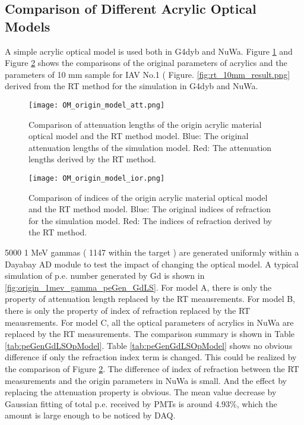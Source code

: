 \subsection{Comparison of Different Acrylic Optical Models}

A simple acrylic optical model is used both in G4dyb and NuWa. Figure \ref{fig:OM_origin_model_att.png} and
Figure \ref{fig:OM_origin_model_ior.png} shows the comparisons of the original parameters of acrylics
and the parameters of 10 mm sample for IAV No.1 ( Figure. \ref{fig:rt_10mm_result.png} derived from the RT method for the simulation in G4dyb and NuWa.


\begin{figure}
    \centering
    \texttt{[image: OM\_origin\_model\_att.png]}
    \caption[Comparison of attenuation length of the origin acrylic material optical model and the RT method model]
{
Comparison of attenuation lengths of the origin acrylic material optical model and the RT method model.
Blue: The original attenuation lengths of the simulation model.
Red: The attenuation lengths derived by the RT method.
}
    \label{fig:OM_origin_model_att.png}
    \end{figure}

\begin{figure}
    \centering
    \texttt{[image: OM\_origin\_model\_ior.png]}
    \caption[Comparison of indices of the origin acrylic material optical model and the RT method model]
{
Comparison of indices of the origin acrylic material optical model and the RT method model.
Blue: The original indices of refraction for the simulation model.
Red: The indices of refraction derived by the RT method.
}
    \label{fig:OM_origin_model_ior.png}
    \end{figure}


5000 1 MeV gammas ( 1147 within the target ) are generated uniformly within a Dayabay AD module to test the impact of changing the optical model.
A typical simulation of p.e. number generated by Gd is shown in \ref{fig:origin_1mev_gamma_peGen_GdLS}.
For model A, there is only the property of attenuation length replaced by the RT meausrements.
For model B, there is only the property of index of refraction replaced by the RT meausrements.
For model C, all the optical parameters of acrylics in NuWa are replaced by the RT measurements.
The comparison summary is shown in Table \ref{tab:peGenGdLSOpModel}.
Table \ref{tab:peGenGdLSOpModel} shows no obvious difference if only the refraction index term is changed.
This could be realized by the comparison of Figure \ref{fig:OM_origin_model_ior.png}. The difference of index of
refraction between the RT measurements and the origin parameters in NuWa is small.
And the effect by replacing the attenuation property is obvious. The mean value decrease by Gaussian fitting of total p.e. received by PMTs
is around 4.93\%, which the amount is large enough to be noticed by DAQ.



